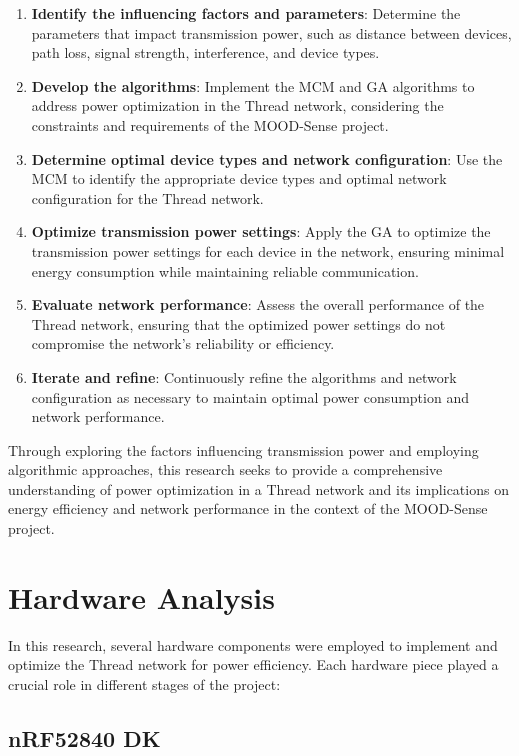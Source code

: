 \begin{enumerate}
    \item \textbf{Identify the influencing factors and parameters}: Determine the parameters that impact transmission power, such as distance between devices, path loss, signal strength, interference, and device types.
    \item \textbf{Develop the algorithms}: Implement the \gls{MCM} and \gls{GA} algorithms to address power optimization in the Thread network, considering the constraints and requirements of the MOOD-Sense project.
    \item \textbf{Determine optimal device types and network configuration}: Use the \gls{MCM} to identify the appropriate device types and optimal network configuration for the Thread network.
    \item \textbf{Optimize transmission power settings}: Apply the \gls{GA} to optimize the transmission power settings for each device in the network, ensuring minimal energy consumption while maintaining reliable communication.
    \item \textbf{Evaluate network performance}: Assess the overall performance of the Thread network, ensuring that the optimized power settings do not compromise the network's reliability or efficiency.
    \item \textbf{Iterate and refine}: Continuously refine the algorithms and network configuration as necessary to maintain optimal power consumption and network performance.
\end{enumerate}

Through exploring the factors influencing transmission power and employing algorithmic approaches, this research seeks to provide a comprehensive understanding of power optimization in a Thread network and its implications on energy efficiency and network performance in the context of the MOOD-Sense project.


\section{Hardware Analysis}

In this research, several hardware components were employed to implement and optimize the Thread network for power efficiency. Each hardware piece played a crucial role in different stages of the project:

\subsection{\texorpdfstring{\gls{nRF}}{nRF}52840 \texorpdfstring{\acrlong{DK}}{DK}}

